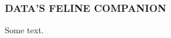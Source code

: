 \documentclass{beamer}
\begin{document}
\begin{frame}
  \frametitle{DATA'S FELINE COMPANION}
  Some text.
\end{frame}
\end{document}
